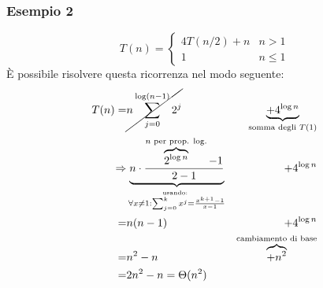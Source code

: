         \subsubsection{Esempio 2}
            $$
                T(n)=\begin{cases}
                    4T(n/2) + n & n>1 \\
                    1 & n\leq 1
                \end{cases}
            $$
            È possibile risolvere questa ricorrenza nel modo seguente:
            $$
                \begin{aligned}
                    T(n)=&\cancel{n\sum_{j=0}^{\log(n-1)} 2^j} &\underbrace{+4^{\log n}}_{\text{somma degli }T(1)}\\
                    \Rightarrow &\underbrace{n\cdot \frac{\overbrace{2^{\log n }}^{n\text{ per prop. log.}}-1}{2-1}}_{\stackrel{\text{usando: }}{\forall x\neq 1:\sum_{j=0}^kx^j=\frac{x^{k+1}-1}{x-1}}}&+4^{\log n}\\
                    =& n(n-1)&+4^{\log n}\\
                    =& n^2-n&\overbrace{+n^2}^{\text{cambiamento di base}}\\
                    =& 2n^2-n = \Theta(n^2)
                \end{aligned}
            $$
